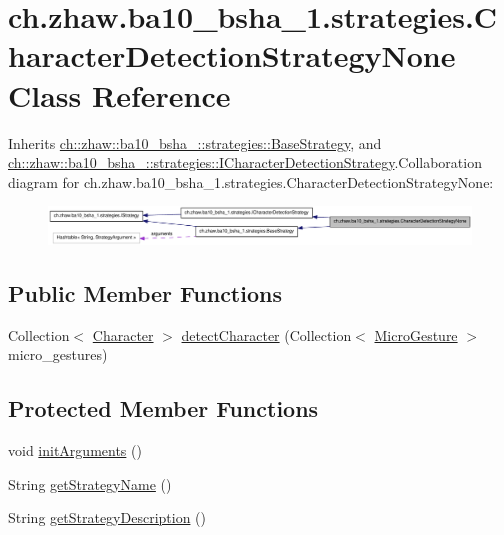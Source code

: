 \hypertarget{classch_1_1zhaw_1_1ba10__bsha__1_1_1strategies_1_1CharacterDetectionStrategyNone}{
\section{ch.zhaw.ba10\_\-bsha\_\-1.strategies.CharacterDetectionStrategyNone Class Reference}
\label{classch_1_1zhaw_1_1ba10__bsha__1_1_1strategies_1_1CharacterDetectionStrategyNone}
}


Inherits \hyperlink{classch_1_1zhaw_1_1ba10__bsha__1_1_1strategies_1_1BaseStrategy}{ch::zhaw::ba10\_\-bsha\_::strategies::BaseStrategy}, and \hyperlink{interfacech_1_1zhaw_1_1ba10__bsha__1_1_1strategies_1_1ICharacterDetectionStrategy}{ch::zhaw::ba10\_\-bsha\_::strategies::ICharacterDetectionStrategy}.Collaboration diagram for ch.zhaw.ba10\_\-bsha\_\-1.strategies.CharacterDetectionStrategyNone:\nopagebreak
\begin{figure}[H]
\begin{center}
\leavevmode
\includegraphics[width=400pt]{classch_1_1zhaw_1_1ba10__bsha__1_1_1strategies_1_1CharacterDetectionStrategyNone__coll__graph}
\end{center}
\end{figure}
\subsection*{Public Member Functions}
\begin{DoxyCompactItemize}
\item 
Collection$<$ \hyperlink{classch_1_1zhaw_1_1ba10__bsha__1_1_1Character}{Character} $>$ \hyperlink{classch_1_1zhaw_1_1ba10__bsha__1_1_1strategies_1_1CharacterDetectionStrategyNone_adb39d671e0a059ace4a695a03ef53906}{detectCharacter} (Collection$<$ \hyperlink{classch_1_1zhaw_1_1ba10__bsha__1_1_1service_1_1MicroGesture}{MicroGesture} $>$ micro\_\-gestures)
\end{DoxyCompactItemize}
\subsection*{Protected Member Functions}
\begin{DoxyCompactItemize}
\item 
void \hyperlink{classch_1_1zhaw_1_1ba10__bsha__1_1_1strategies_1_1CharacterDetectionStrategyNone_af7c760085a5347e359b83c02eb23af27}{initArguments} ()
\item 
String \hyperlink{classch_1_1zhaw_1_1ba10__bsha__1_1_1strategies_1_1CharacterDetectionStrategyNone_a9ee9165c5f2511331b3defaa48d35b4c}{getStrategyName} ()
\item 
String \hyperlink{classch_1_1zhaw_1_1ba10__bsha__1_1_1strategies_1_1CharacterDetectionStrategyNone_a77ffbdb8eb70ff5517bb8821a2c23572}{getStrategyDescription} ()
\end{DoxyCompactItemize}


